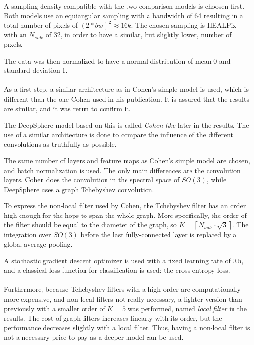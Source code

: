 \documentclass[11pt]{report}
\begin{document}
\paragraph*{}
A sampling density compatible with the two comparison models is choosen first. Both models use an equiangular sampling with a bandwidth of 64 resulting in a total number of pixels of $(2*bw)^2\approx16k$. The chosen sampling is HEALPix with an $N_{side}$ of 32, in order to have a similar, but slightly lower, number of pixels.

The data was then normalized to have a normal distribution of mean 0 and standard deviation 1.

\paragraph*{}
As a first step, a similar architecture as in Cohen's simple model is used, which is different than the one Cohen used in his publication. It is assured that the results are similar, and it was rerun to confirm it. 

The DeepSphere model based on this is called \emph{Cohen-like} later in the results. The use of a similar architecture is done to compare the influence of the different convolutions as truthfully as possible.

The same number of layers and feature maps as Cohen's simple model are chosen, and batch normalization is used. The only main differences are the convolution layers. Cohen does the convolution in the spectral space of $SO(3)$, while DeepSphere uses a graph Tchebyshev convolution.

To express the non-local filter used by Cohen, the Tchebyshev filter has an order high enough for the hops to span the whole graph. More specifically, the order of the filter should be equal to the diameter of the graph, so $K = \left\lceil{N_{side}\cdot\sqrt{3}}\right\rceil$. The integration over $SO(3)$ before the last fully-connected layer is replaced by a global average pooling.

A stochastic gradient descent optimizer is used with a fixed learning rate of $0.5$, and a classical loss function for classification is used: the cross entropy loss.
\paragraph*{}
Furthermore, because Tchebyshev filters with a high order are computationally more expensive, and non-local filters not really necessary, a lighter version than previously with a smaller order of $K=5$ was performed, named \emph{local filter} in the results. The cost of graph filters increases linearly with its order, but the performance decreases slightly with a local filter. Thus, having a non-local filter is not a necessary price to pay as a deeper model can be used.
\end{document}
